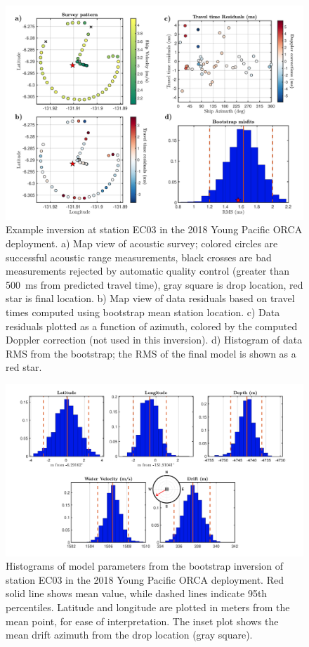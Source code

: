 \begin{figure}[h]
\includegraphics[trim=0cm 0cm 0cm 0cm,clip=true,width=\columnwidth]{Figure02.pdf}
\caption{Example inversion at station EC03 in the 2018 Young Pacific ORCA deployment. a) Map view of acoustic survey; colored circles are successful acoustic range measurements, black crosses are bad measurements rejected by automatic quality control (greater than 500~ms from predicted travel time), gray square is drop location, red star is final location. b) Map view of data residuals based on travel times computed using bootstrap mean station location. c) Data residuals plotted as a function of azimuth, colored by the computed Doppler correction (not used in this inversion). d) Histogram of data RMS from the bootstrap; the RMS of the final model is shown as a red star.}
\label{fig:one_sta_real_survey}
\end{figure}

\newpage

\begin{figure}[h]
\includegraphics[trim=0cm 0cm 0cm 0cm,clip=true,width=\columnwidth]{Figure03.pdf}
\caption{Histograms of model parameters from the bootstrap inversion of station EC03 in the 2018 Young Pacific ORCA deployment. Red solid line shows mean value, while dashed lines indicate 95th percentiles. Latitude and longitude are plotted in meters from the mean point, for ease of interpretation. The inset plot shows the mean drift azimuth from the drop location (gray square).}
\label{fig:one_sta_real_histograms}
\end{figure}

